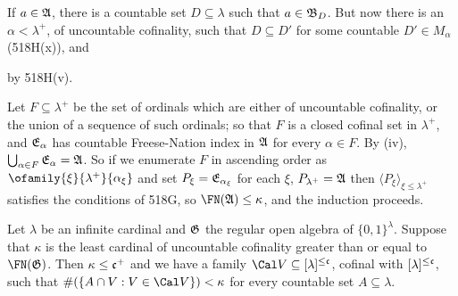 {\medskip

 If $a\in\frak A$, there is a countable set
$D\subseteq\lambda$ such that $a\in\frak B_D$.   But now there is an
$\alpha<\lambda^+$, of uncountable cofinality, such that $D\subseteq D'$
for some countable $D'\in M_{\alpha}$ (518H(x)), and


\noindent by 518H(v).

\medskip

 Let $F\subseteq\lambda^+$ be the set of ordinals which
are either of uncountable cofinality, or the union of a sequence of such
ordinals;  so that $F$ is a closed cofinal
set in $\lambda^+$, and $\frak E_{\alpha}$
has countable Freese-Nation index in $\frak A$ for every $\alpha\in F$.
By (iv), $\bigcup_{\alpha\in F}\frak E_{\alpha}=\frak A$.   So if we enumerate
$F$ in ascending order as $\ofamily{\xi}{\lambda^+}{\alpha_{\xi}}$ and
set $P_{\xi}=\frak E_{\alpha_{\xi}}$ for each $\xi$, $P_{\lambda^+}=\frak A$
then $\langle P_{\xi}\rangle_{\xi\le\lambda^+}$ satisfies the conditions
of 518G, so $\FN(\frak A)\le\kappa$, and the induction proceeds.
}%

 Let $\lambda$ be an infinite cardinal and $\frak G$
the regular open algebra of $\{0,1\}^{\lambda}$.   Suppose
that $\kappa$ is the least cardinal of uncountable cofinality greater
than or equal to $\FN(\frak G)$.   Then $\kappa\le\frak c^+$ and we have
a family $\Cal V\subseteq[\lambda]^{\le\frak c}$, cofinal with
$[\lambda]^{\le\frak c}$, such that $\#(\{A\cap V:V\in\Cal V\})<\kappa$
for every countable set $A\subseteq\lambda$.

